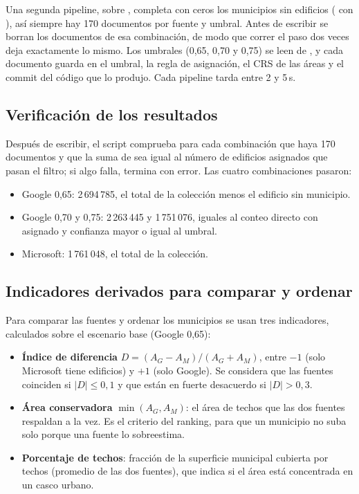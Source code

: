 Una segunda pipeline, sobre , completa con ceros los
municipios sin edificios ( con
), así siempre hay 170 documentos por fuente
y umbral. Antes de escribir se borran los documentos de esa combinación, de
modo que correr el paso dos veces deja exactamente lo mismo. Los umbrales
(0,65, 0,70 y 0,75) se leen de , y cada documento guarda en
 el umbral, la regla de asignación, el CRS de las áreas y el
commit del código que lo produjo. Cada pipeline tarda entre 2 y 5\,s.

\subsection{Verificación de los resultados}
\label{sec:verificacion}

Después de escribir, el script comprueba para cada combinación que haya 170
documentos y que la suma de  sea igual al número de
edificios asignados que pasan el filtro; si algo falla, termina con error. Las
cuatro combinaciones pasaron:

\begin{itemize}
  \item Google 0,65: 2\,694\,785, el total de la colección menos el edificio
        sin municipio.
  \item Google 0,70 y 0,75: 2\,263\,445 y 1\,751\,076, iguales al conteo
        directo con  asignado y confianza mayor o igual al
        umbral.
  \item Microsoft: 1\,761\,048, el total de la colección.
\end{itemize}

\subsection{Indicadores derivados para comparar y ordenar}
\label{sec:indicadores}

Para comparar las fuentes y ordenar los municipios se usan tres indicadores,
calculados sobre el escenario base (Google 0,65):

\begin{itemize}
  \item \textbf{Índice de diferencia}
        $D = (A_G - A_M)/(A_G + A_M)$, entre $-1$ (solo Microsoft tiene
        edificios) y $+1$ (solo Google). Se considera que las fuentes
        coinciden si $|D| \leq 0{,}1$ y que están en fuerte desacuerdo si
        $|D| > 0{,}3$.
  \item \textbf{Área conservadora} $\min(A_G, A_M)$: el área de techos que
        las dos fuentes respaldan a la vez. Es el criterio del ranking, para
        que un municipio no suba solo porque una fuente lo sobreestima.
  \item \textbf{Porcentaje de techos}: fracción de la superficie municipal
        cubierta por techos (promedio de las dos fuentes), que indica si el
        área está concentrada en un casco urbano.
\end{itemize}
